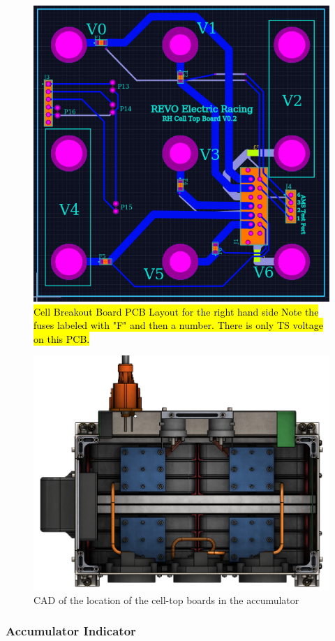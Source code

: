 \documentclass{article}
\DeclareRobustCommand{\hlr}[1]{{\sethlcolor{red}\hl{#1}}}
\begin{document}
            \begin{figure}[H]
                \centering
                \includegraphics[width = 0.4 \textwidth]{CellTopRH}
                \caption{\hlr{Cell Breakout Board PCB Layout for the right hand side Note the fuses labeled with "F" and then a number. There is only TS voltage on this PCB.}}
                \label{celltopRH}
            \end{figure}

            \begin{figure}[H]
                \centering
                \includegraphics[width = 0.6 \textwidth]{batterybox_topview}
                \caption{CAD of the location of the cell-top boards in the accumulator}
                \label{accumtopcad}
            \end{figure}

        \subsubsection{Accumulator Indicator} \label{aindicator}

\end{document}
